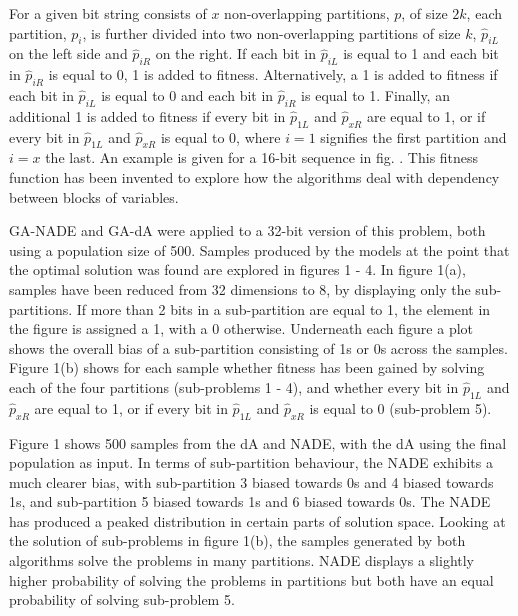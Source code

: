 \documentclass[twoside]{article}
\begin{document}
For a given bit string consists of \(x\) non-overlapping partitions, \(p\), of size \(2k\), each partition, \(p_i\), is further divided into two non-overlapping partitions of size \(k\), \(\hat{p}_{iL}\) on the left side and \(\hat{p}_{iR}\) on the right. If each bit in \(\hat{p}_{iL}\) is equal to 1 and each bit in \(\hat{p}_{iR}\) is equal to 0, 1 is added to fitness. Alternatively, a 1 is added to fitness if each bit in \(\hat{p}_{iL}\) is equal to 0 and each bit in \(\hat{p}_{iR}\) is equal to 1. Finally, an additional 1 is added to fitness if every bit in \(\hat{p}_{1L}\) and \(\hat{p}_{xR}\) are equal to 1, or if every bit in \(\hat{p}_{1L}\) and \(\hat{p}_{xR}\) is equal to 0, where \(i=1\) signifies the first partition and \(i=x\) the last. An example is given for a 16-bit sequence in fig. . This fitness function has been invented to explore how the algorithms deal with dependency between blocks of variables.

GA-NADE and GA-dA were applied to a 32-bit version of this problem, both using a population size of 500. Samples produced by the models at the point that the optimal solution was found are explored in figures 1 - 4. In figure 1(a), samples have been reduced from 32 dimensions to 8, by displaying only the sub-partitions. If more than 2 bits in a sub-partition are equal to 1, the element in the figure is assigned a 1, with a 0 otherwise. Underneath each figure a plot shows the overall bias of a sub-partition consisting of 1s or 0s across the samples. Figure 1(b) shows for each sample whether fitness has been gained by solving each of the four partitions (sub-problems 1 - 4), and whether every bit in \(\hat{p}_{1L}\) and \(\hat{p}_{xR}\) are equal to 1, or if every bit in \(\hat{p}_{1L}\) and \(\hat{p}_{xR}\) is equal to 0 (sub-problem 5).

Figure 1 shows 500 samples from the dA and NADE, with the dA using the final population as input. In terms of sub-partition behaviour, the NADE exhibits a much clearer bias, with sub-partition 3 biased towards 0s and 4 biased towards 1s, and sub-partition 5 biased towards 1s and 6 biased towards 0s. The NADE has produced a peaked distribution in certain parts of solution space. Looking at the solution of sub-problems in figure 1(b), the samples generated by both algorithms solve the problems in many partitions. NADE displays a slightly higher probability of solving the problems in partitions but both have an equal probability of solving sub-problem 5.
\end{document}
